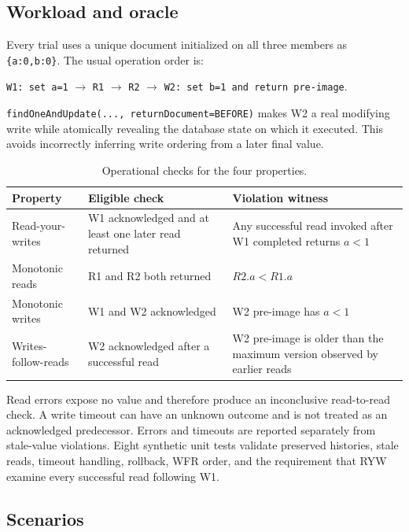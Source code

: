 \documentclass[11pt,a4paper]{article}
\begin{document}
\subsection{Workload and oracle}
Every trial uses a unique document initialized on all three members as
\texttt{\{a:0,b:0\}}. The usual operation order is:

\begin{center}
\texttt{W1: set a=1} $\rightarrow$ \texttt{R1} $\rightarrow$ \texttt{R2}
$\rightarrow$ \texttt{W2: set b=1 and return pre-image}.
\end{center}

\texttt{findOneAndUpdate(..., returnDocument=BEFORE)} makes W2 a real modifying write while
atomically revealing the database state on which it executed. This avoids incorrectly
inferring write ordering from a later final value.

\begin{table}[ht]
\centering
\caption{Operational checks for the four properties.}
\begin{tabularx}{\textwidth}{@{}p{31mm}YY@{}}
\toprule
Property & Eligible check & Violation witness\\
\midrule
Read-your-writes & W1 acknowledged and at least one later read returned & Any successful read invoked after W1 completed returns $a<1$\\
Monotonic reads & R1 and R2 both returned & $R2.a<R1.a$\\
Monotonic writes & W1 and W2 acknowledged & W2 pre-image has $a<1$\\
Writes-follow-reads & W2 acknowledged after a successful read & W2 pre-image is older than the maximum version observed by earlier reads\\
\bottomrule
\end{tabularx}
\end{table}

Read errors expose no value and therefore produce an inconclusive read-to-read check. A
write timeout can have an unknown outcome and is not treated as an acknowledged predecessor.
Errors and timeouts are reported separately from stale-value violations. Eight synthetic
unit tests validate preserved histories, stale reads, timeout handling, rollback, WFR order,
and the requirement that RYW examine every successful read following W1.

\subsection{Scenarios}
\end{document}
